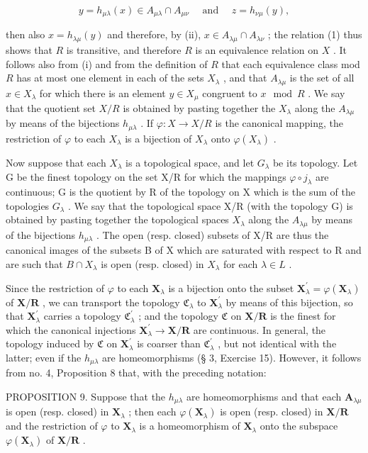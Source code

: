\[
y = h _ {\mu \lambda} (x) \in A _ {\mu \lambda} \cap A _ {\mu \nu} \quad \text { and } \quad z = h _ {\nu \mu} (y),
\]

then also \(x = h_{\lambda \mu}(y)\) and therefore, by (ii), \(x \in A_{\lambda \mu} \cap A_{\lambda \nu}\) ; the relation (1) thus shows that \(R\) is transitive, and therefore \(R\) is an equivalence relation on \(X\) . It follows also from (i) and from the definition of \(R\) that each equivalence class mod \(R\) has at most one element in each of the sets \(X_{\lambda}\) , and that \(A_{\lambda \mu}\) is the set of all \(x \in X_{\lambda}\) for which there is an element \(y \in X_{\mu}\) congruent to \(x \mod R\) . We say that the quotient set \(X / R\) is obtained by pasting together the \(X_{\lambda}\) along the \(A_{\lambda \mu}\) by means of the bijections \(h_{\mu \lambda}\) . If \(\varphi: X \to X / R\) is the canonical mapping, the restriction of \(\varphi\) to each \(X_{\lambda}\) is a bijection of \(X_{\lambda}\) onto \(\varphi(X_{\lambda})\) .

Now suppose that each \(X_{\lambda}\) is a topological space, and let \(G_{\lambda}\) be its topology. Let G be the finest topology on the set X/R for which the mappings \(\varphi \circ j_{\lambda}\) are continuous; G is the quotient by R of the topology on X which is the sum of the topologies \(G_{\lambda}\) . We say that the topological space X/R (with the topology G) is obtained by pasting together the topological spaces \(X_{\lambda}\) along the \(A_{\lambda\mu}\) by means of the bijections \(h_{\mu\lambda}\) . The open (resp. closed) subsets of X/R are thus the canonical images of the subsets B of X which are saturated with respect to R and are such that \(B \cap X_{\lambda}\) is open (resp. closed) in \(X_{\lambda}\) for each \(\lambda \in L\) .

Since the restriction of \(\varphi\) to each \(\mathbf{X}_{\lambda}\) is a bijection onto the subset \(\mathbf{X}_{\lambda}^{\prime} = \varphi (\mathbf{X}_{\lambda})\) of \(\mathbf{X} / \mathbf{R}\) , we can transport the topology \(\mathfrak{C}_{\lambda}\) to \(\mathbf{X}_{\lambda}^{\prime}\) by means of this bijection, so that \(\mathbf{X}_{\lambda}^{\prime}\) carries a topology \(\mathfrak{C}_{\lambda}^{\prime}\) ; and the topology \(\mathfrak{C}\) on \(\mathbf{X} / \mathbf{R}\) is the finest for which the canonical injections \(\mathbf{X}_{\lambda}^{\prime} \to \mathbf{X} / \mathbf{R}\) are continuous. In general, the topology induced by \(\mathfrak{C}\) on \(\mathbf{X}_{\lambda}^{\prime}\) is coarser than \(\mathfrak{C}_{\lambda}^{\prime}\) , but not identical with the latter; even if the \(h_{\mu \lambda}\) are homeomorphisms (§ 3, Exercise 15). However, it follows from no. 4, Proposition 8 that, with the preceding notation:

PROPOSITION 9. Suppose that the \(h_{\mu \lambda}\) are homeomorphisms and that each \(\mathbf{A}_{\lambda \mu}\) is open (resp. closed) in \(\mathbf{X}_{\lambda}\) ; then each \(\varphi(\mathbf{X}_{\lambda})\) is open (resp. closed) in \(\mathbf{X}/\mathbf{R}\) and the restriction of \(\varphi\) to \(\mathbf{X}_{\lambda}\) is a homeomorphism of \(\mathbf{X}_{\lambda}\) onto the subspace \(\varphi(\mathbf{X}_{\lambda})\) of \(\mathbf{X}/\mathbf{R}\) .

